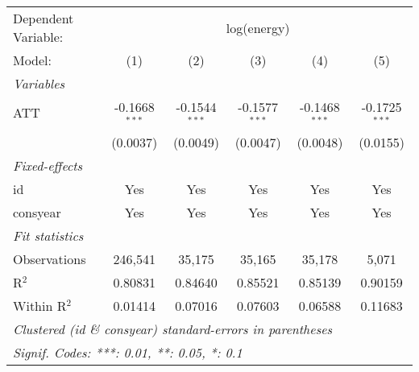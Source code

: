 
\begingroup
\centering
\begin{tabular}{lccccc}
   \tabularnewline \midrule \midrule
   Dependent Variable: & \multicolumn{5}{c}{log(energy)}\\
   Model:       & (1)             & (2)             & (3)             & (4)             & (5)\\  
   \midrule
   \emph{Variables}\\
   ATT          & -0.1668$^{***}$ & -0.1544$^{***}$ & -0.1577$^{***}$ & -0.1468$^{***}$ & -0.1725$^{***}$\\   
                & (0.0037)        & (0.0049)        & (0.0047)        & (0.0048)        & (0.0155)\\   
   \midrule
   \emph{Fixed-effects}\\
   id           & Yes             & Yes             & Yes             & Yes             & Yes\\  
   consyear     & Yes             & Yes             & Yes             & Yes             & Yes\\  
   \midrule
   \emph{Fit statistics}\\
   Observations & 246,541         & 35,175          & 35,165          & 35,178          & 5,071\\  
   R$^2$        & 0.80831         & 0.84640         & 0.85521         & 0.85139         & 0.90159\\  
   Within R$^2$ & 0.01414         & 0.07016         & 0.07603         & 0.06588         & 0.11683\\  
   \midrule \midrule
   \multicolumn{6}{l}{\emph{Clustered (id \& consyear) standard-errors in parentheses}}\\
   \multicolumn{6}{l}{\emph{Signif. Codes: ***: 0.01, **: 0.05, *: 0.1}}\\
\end{tabular}
\par\endgroup


